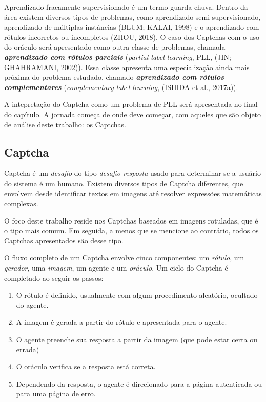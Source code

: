 \documentclass[12pt,twoside,brazilian]{book}
\providecommand{\tightlist}{%
  \setlength{\itemsep}{0pt}\setlength{\parskip}{0pt}}
\begin{document}
Aprendizado fracamente supervisionado é um termo guarda-chuva. Dentro da
área existem diversos tipos de problemas, como aprendizado
semi-supervisionado, aprendizado de múltiplas instâncias (BLUM; KALAI,
1998) e o aprendizado com rótulos incorretos ou incompletos (ZHOU,
2018). O caso dos Captchas com o uso do oráculo será apresentado como
outra classe de problemas, chamada \textbf{\emph{aprendizado com rótulos
parciais}} (\emph{partial label learning}, PLL, (JIN; GHAHRAMANI,
2002)). Essa classe apresenta uma especialização ainda mais próxima do
problema estudado, chamado \textbf{\emph{aprendizado com rótulos
complementares}} (\emph{complementary label learning}, (ISHIDA et al.,
2017a)).

A intepretação do Captcha como um problema de PLL será apresentada no
final do capítulo. A jornada começa de onde deve começar, com aqueles
que são objeto de análise deste trabalho: os Captchas.

\hypertarget{sec-definicao-captcha}{%
\subsection{Captcha}\label{sec-definicao-captcha}}

Captcha é um \emph{desafio} do tipo \emph{desafio-resposta} usado para
determinar se a usuário do sistema é um humano. Existem diversos tipos
de Captcha diferentes, que envolvem desde identificar textos em imagens
até resolver expressões matemáticas complexas.

O foco deste trabalho reside nos Captchas baseados em imagens rotuladas,
que é o tipo mais comum. Em seguida, a menos que se mencione ao
contrário, todos os Captchas apresentados são desse tipo.

O fluxo completo de um Captcha envolve cinco componentes: um
\emph{rótulo}, um \emph{gerador}, uma \emph{imagem}, um agente e um
\emph{oráculo}. Um ciclo do Captcha é completado ao seguir os passos:

\begin{enumerate}
\def\labelenumi{\arabic{enumi}.}
\tightlist
\item
  O rótulo é definido, usualmente com algum procedimento aleatório,
  ocultado do agente.
\item
  A imagem é gerada a partir do rótulo e apresentada para o agente.
\item
  O agente preenche sua resposta a partir da imagem (que pode estar
  certa ou errada)
\item
  O oráculo verifica se a resposta está correta.
\item
  Dependendo da resposta, o agente é direcionado para a página
  autenticada ou para uma página de erro.
\end{enumerate}
\end{document}
